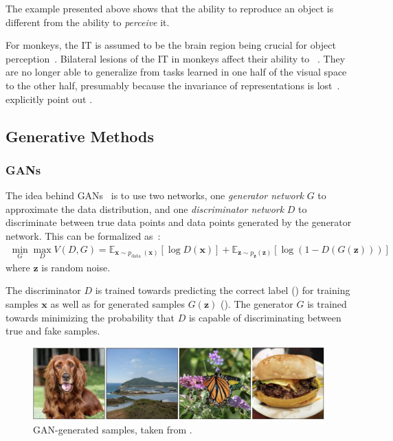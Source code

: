 The example presented above shows that the ability to reproduce an object is different from the ability to \textit{perceive} it.

For monkeys, the \ac{IT} is assumed to be the brain region being crucial for object perception~\citep[pp. 1070, 1071]{squire2012fundamental}.
Bilateral lesions of the \ac{IT} in monkeys affect their ability to ~\citep[p. 1070]{squire2012fundamental}.
They are no longer able to generalize from tasks learned in one half of the visual space to the other half, presumably because the invariance of representations is lost~\citep[p. 1070]{squire2012fundamental}.
\citet[p. 1071]{squire2012fundamental} explicitly point out .

\subsection{Generative Methods}\label{subsec:generative-methods}

\subsubsection{\acfp{GAN}}

The idea behind \acp{GAN}~\citep{goodfellow2014gans} is to use two networks, one \textit{generator network} $G$ to approximate the data distribution, and one \textit{discriminator network} $D$ to discriminate between true data points and data points generated by the generator network.
This can be formalized as~\citep{goodfellow2014gans}:
\begin{align}
    \min _{G} \max _{D} V(D, G)=\mathbb{E}_{\bm{x} \sim p_{\text {data }}(\bm{x})}[\log D(\bm{x})]+\mathbb{E}_{\bm{z} \sim p_{\bm{z}}(\bm{z})}[\log (1-D(G(\bm{z})))] \label{eq:gan_objective}
\end{align}
where $\bm{z}$ is random noise.

The discriminator $D$ is trained towards predicting the correct label () for training samples $\bm{x}$ as well as for generated samples $G(\bm{z})$ ().
The generator $G$ is trained towards minimizing the probability that $D$ is capable of discriminating between true and fake samples.

\begin{figure}
    \centering
    \includegraphics[width=\textwidth]{images/gan_samples.png}
    \caption{\ac{GAN}-generated samples, taken from \citet{brock2018large}.}
    \label{fig:gan_samples}
\end{figure}

